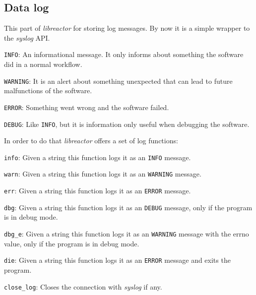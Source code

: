 \subsection{Data log}
\label{sec:log}
This part of \emph{libreactor} for storing log messages. By now it is a simple wrapper to the \emph{syslog} API\cite{man:syslog}.
\begin{list}{-}{We consider four levels of messages:}
  \item \texttt{INFO}: An informational message. It only informs about something the software did in a normal workflow.
  \item \texttt{WARNING}: It is an alert about something unexpected that can lead to future malfunctions of the software.
  \item \texttt{ERROR}: Something went wrong and the software failed.
  \item \texttt{DEBUG}: Like \texttt{INFO}, but it is information only useful when debugging the software.
\end{list}
In order to do that \emph{libreactor} offers a set of log functions:
\begin{list}{-}{}
  \item \texttt{info}: Given a string this function logs it as an \texttt{INFO} message.
  \item \texttt{warn}: Given a string this function logs it as an \texttt{WARNING} message.
  \item \texttt{err}: Given a string this function logs it as an \texttt{ERROR} message. 
  \item \texttt{dbg}: Given a string this function logs it as an \texttt{DEBUG} message, only if the program is in debug mode.
  \item \texttt{dbg\_e}: Given a string this function logs it as an \texttt{WARNING} message with the errno value, only if the program
    is in debug mode.
  \item \texttt{die}: Given a string this function logs it as an \texttt{ERROR} message and exits the program.
  \item \texttt{close\_log}: Closes the connection with \emph{syslog} if any.
\end{list}

